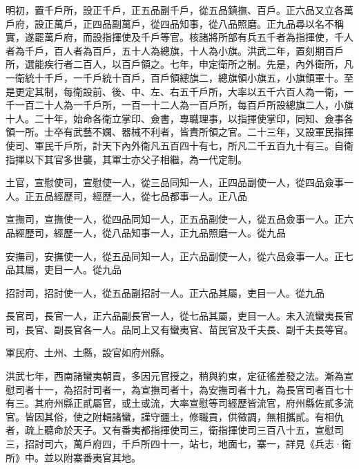明初，置千戶所，設正千戶，正五品副千戶，從五品鎮撫、百戶。正六品又立各萬戶府，設正萬戶，正四品副萬戶，從四品知事，從八品照磨。正九品尋以名不稱實，遂罷萬戶府，而設指揮使及千戶等官。核諸將所部有兵五千者為指揮使，千人者為千戶，百人者為百戶，五十人為總旗，十人為小旗。洪武二年，置刻期百戶所，選能疾行者二百人，以百戶領之。七年，申定衛所之制。先是，內外衛所，凡一衛統十千戶，一千戶統十百戶，百戶領總旗二，總旗領小旗五，小旗領軍十。至是更定其制，每衛設前、後、中、左、右五千戶所，大率以五千六百人為一衛，一千一百二十人為一千戶所，一百一十二人為一百戶所，每百戶所設總旗二人，小旗十人。二十年，始命各衛立掌印、僉書，專職理事，以指揮使掌印，同知、僉事各領一所。士卒有武藝不嫻、器械不利者，皆責所領之官。二十三年，又設軍民指揮使司、軍民千戶所，計天下內外衛凡五百四十有七，所凡二千五百九十有三。自衛指揮以下其官多世襲，其軍士亦父子相繼，為一代定制。

土官，宣慰使司，宣慰使一人，從三品同知一人，正四品副使一人，從四品僉事一人。正五品經歷司，經歷一人，從七品都事一人。正八品

宣撫司，宣撫使一人，從四品同知一人，正五品副使一人，從五品僉事一人。正六品經歷司，經歷一人，從八品知事一人，正九品照磨一人。從九品

安撫司，安撫使一人，從五品同知一人，正六品副使一人，從六品僉事一人。正七品其屬，吏目一人。從九品

招討司，招討使一人，從五品副招討一人。正六品其屬，吏目一人。從九品

長官司，長官一人，正六品副長官一人，從七品其屬，吏目一人。未入流蠻夷長官司，長官、副長官各一人。品同上又有蠻夷官、苗民官及千夫長、副千夫長等官。

軍民府、土州、土縣，設官如府州縣。

洪武七年，西南諸蠻夷朝貢，多因元官授之，稍與約束，定征徭差發之法。漸為宣慰司者十一，為招討司者一，為宣撫司者十，為安撫司者十九，為長官司者百七十有三。其府州縣正貳屬官，或土或流，大率宣慰等司經歷皆流官，府州縣佐貳多流官。皆因其俗，使之附輯諸蠻，謹守疆土，修職貢，供徵調，無相攜貳。有相仇者，疏上聽命於天子。又有番夷都指揮使司三，衛指揮使司三百八十五，宣慰司三，招討司六，萬戶府四，千戶所四十一，站七，地面七，寨一，詳見《兵志·衛所》中。並以附寨番夷官其地。

